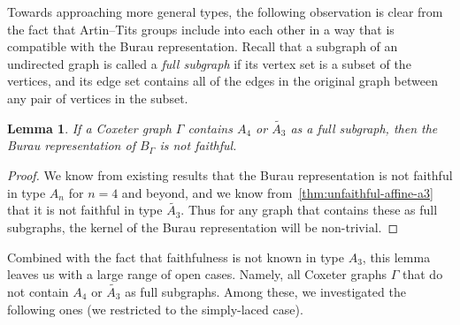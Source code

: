\documentclass[a4paper]{amsart}
\newcommand{\0}{\mathbf{0}}
\theoremstyle{theorem}
\newtheorem{lemma}[theorem]{Lemma}
\begin{document}
Towards approaching more general types, the following observation is clear from the fact that Artin--Tits groups include into each other in a way that is compatible with the Burau representation.
Recall that a subgraph of an undirected graph is called a \emph{full subgraph} if its vertex set is a subset of the vertices, and its edge set contains all of the edges in the original graph between any pair of vertices in the subset.
\begin{lemma}
  If a Coxeter graph $\Gamma$ contains $A_4$ or \(\widetilde{A_3}\) as a full subgraph, then the Burau representation of $B_\Gamma$ is not faithful.
\end{lemma}
\begin{proof}
  We know from existing results that the Burau representation is not faithful in type \(A_n\) for \(n = 4\) and beyond, and we know from~\cref{thm:unfaithful-affine-a3} that it is not faithful in type \(\widetilde{A_3}\).
  Thus for any graph that contains these as full subgraphs, the kernel of the Burau representation will be non-trivial.
\end{proof}
Combined with the fact that faithfulness is not known in type \(A_3\), this lemma leaves us with a large range of open cases.
Namely, all Coxeter graphs \(\Gamma\) that do not contain \(A_4\) or \(\widetilde{A_3}\) as full subgraphs.
Among these, we investigated the following ones (we restricted to the simply-laced case).
\end{document}

